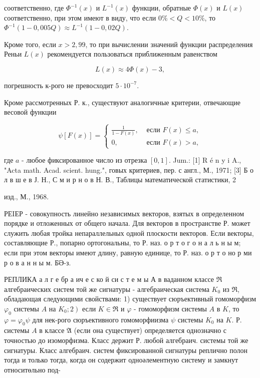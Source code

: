 \documentclass[10pt]{article}
\begin{document}
соответственно, где $\Phi^{-1}(x)$ и $L^{-1}(x)$ функции, обратные $\Phi(x)$ и $L(x)$ соответственно, при этом имеют в виду, что если $0 \%<Q<10 \%$, то $\Phi^{-1}(1-0,005 Q) \approx L^{-1}(1-0,02 Q)$.



Кроме того, если $x>2,99$, то при вычислении значений функции распределения Реньи $L(x)$ рекомендуется пользоваться приближенным равенством



\[

L(x) \approx 4 \Phi(x)-3,

\]



погрешность к-рого не превосходит $5 \cdot 10^{-7}$.



Кроме рассмотренных Р. к., существуют аналогичные критерии, отвечающие весовой функции



\[

\psi[F(x)]=\left\{\begin{array}{cl}

\frac{1}{1-F(x)}, & \text { если } F(x) \leqslant a, \\

0, & \text { если } F(x)>a,

\end{array}\right.

\]



где $a$ - любое фиксированное число из отрезка $[0,1]$. Jum.: [1] R é n y i A., "Acta math. Acad. scient. hung.", говых критериев, пер. с англ., М., 1971; [3] Б о л в ш е в Ј. Н., С м и р н о в Н. В., Таблицы математической статистики, 2

изд., М., 1968.



РЕIЕР - совокупность линейно независимых векторов, взятых в определенном порядке и отложенных от общего начала. Для векторов в пространстве Р. может служить любая тройка непараллельных одной плоскости векторов. Если векторы, составляющие Р., попарно ортогональны, то Р. наз. о р т о г о н а л ь н ы м; если при этом векторы имеют длину, равную единице, то Р. наз. о р т о но р ми р о в а н н ы м. Б̈Ә-з.



РЕПЛИКА а л г е бр а ич е с ко й си с т е м ы А в ваданном классе $\mathscr{\Re}$ алгебраических систем той же сигнатуры - алгебраическая система $K_{0}$ из $\Re$, обладающая следующими свойствами: 1) существует сюръективный гомоморфизм $\varphi_{0}$ системы $A$ на $\left.K_{0} ; 2\right)$ если $K \in \mathscr{\Re}$ и $\varphi$ - гомоморфизм системы $A$ в $K$, то $\varphi=\varphi_{0} \psi$ для нек-рого сюръективного гомоморфиизма $\psi$ системы $K_{0}$ на $K$. Р. системы $A$ в классе $\mathfrak{A}$ (если она существует) определяется однозначно с точностью до изоморфизма. Класс держит Р. любой алгебраич. системы той же сигнатуры. Класс алгебраич. систем фиксированной сигнатуры реплично полон тогда и только тогда, когда он содержит одноәлементную систему и замкнут относитөльно под-
\end{document}
